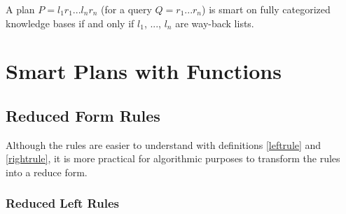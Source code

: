 \documentclass[10pt,a4paper,draft]{article}
\begin{document}
\begin{Corrollary}
A plan $P = l_1 r_1 ... l_n r_n $ (for a query $Q = r_1 ... r_n$) is smart on fully categorized knowledge bases if and only if $l_1$, ..., $l_n$ are way-back lists.
\end{Corrollary}

\section{Smart Plans with Functions}



\subsection{Reduced Form Rules}

Although the rules are easier to understand with definitions \ref{leftrule} and \ref{rightrule}, it is more practical for algorithmic purposes to transform the rules into a reduce form.

\subsubsection{Reduced Left Rules}
\label{reducedleftrules}
\end{document}
